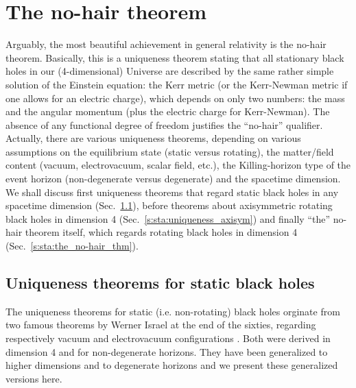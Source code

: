 
\section{The no-hair theorem} \label{s:sta:no-hair}

Arguably, the most beautiful achievement in general relativity is the
no-hair theorem.
Basically, this is a uniqueness theorem stating that all stationary black holes in our (4-dimensional) Universe are
described by the same rather simple solution of the Einstein equation: the Kerr metric
(or the Kerr-Newman metric if one allows for an electric charge), which depends on only
two numbers: the mass and the angular momentum (plus the electric charge for Kerr-Newman).
The absence of any functional degree of freedom justifies the ``no-hair'' qualifier.
Actually, there are various uniqueness theorems, depending on various assumptions
on the equilibrium state (static versus rotating),
the matter/field content (vacuum, electrovacuum, scalar field, etc.),
the Killing-horizon type of the event horizon (non-degenerate versus degenerate) and the spacetime
dimension. We shall discuss first uniqueness theorems that regard static black holes
in any spacetime dimension (Sec.~\ref{s:sta:uniqueness_static}), before
theorems about axisymmetric rotating black holes in dimension 4 (Sec.~\ref{s:sta:uniqueness_axisym})
and finally ``the'' no-hair theorem itself, which regards rotating black holes in dimension 4
(Sec.~\ref{s:sta:the_no-hair_thm}).


\subsection{Uniqueness theorems for static black holes} \label{s:sta:uniqueness_static}

The uniqueness theorems for static (i.e. non-rotating) black holes orginate from
two famous theorems by Werner Israel at the end of the sixties,
regarding respectively vacuum \cite{Israe67}
and electrovacuum configurations \cite{Israe68}. Both were derived in dimension 4
and for non-degenerate horizons. They have been generalized to higher dimensions
and to degenerate horizons and we present these generalized versions here.


